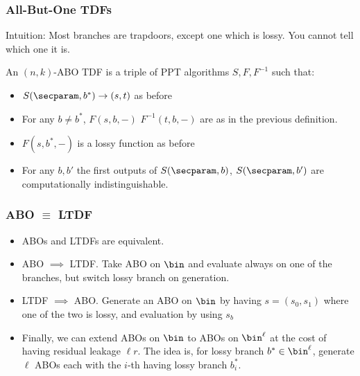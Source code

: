 \documentclass{beamer}
\begin{document}
\begin{frame}
    \frametitle{All-But-One TDFs}
    Intuition: Most branches are trapdoors, except one which is lossy. You cannot tell which one it is.
    \begin{definition}
        An $(n, k)$-ABO TDF is a triple of PPT algorithms $S, F, F^{-1}$ such that:
        \begin{itemize}
            \item $S(\secparam, b^*) \rightarrow (s, t)$ as before
            \item For any $b \neq b^*$, $F(s, b, {-})$ $F^{-1}(t, b, {-})$ are as in the previous definition.
            \item $F(s, b^*, {-})$ is a lossy function as before
            \item For any $b,b'$ the first outputs of $S(\secparam, b)$, $S(\secparam, b')$ are computationally indistinguishable.
        \end{itemize}
    \end{definition}
\end{frame}

\begin{frame}
    \frametitle{ABO $\equiv$ LTDF}
    \begin{itemize}
        \item ABOs and LTDFs are equivalent.
        \item ABO $\implies$ LTDF. Take ABO on $\bin$ and evaluate always on one of the branches, but switch lossy branch on generation.
        \item LTDF $\implies$ ABO. Generate an ABO on $\bin$ by having $s = (s_0, s_1)$ where one of the two is lossy, and evaluation by using $s_b$
        \item Finally, we can extend ABOs on $\bin$ to ABOs on $\bin^\ell$ at the cost of having residual leakage $\ell r$. The idea is,
              for lossy branch $b^* \in \bin^\ell$, generate $\ell$ ABOs each with the $i$-th having lossy branch $b^*_i$.
    \end{itemize}
\end{frame}
\end{document}
